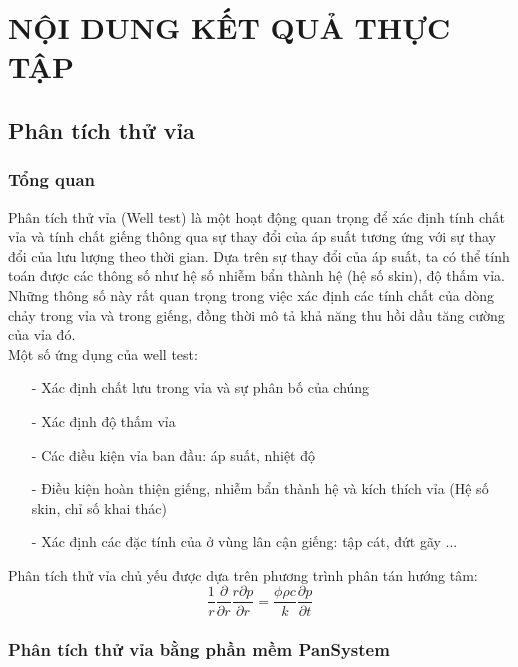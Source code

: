 \documentclass[12pt,a4paper]{report}
\begin{document}
\chapter{NỘI DUNG KẾT QUẢ THỰC TẬP}
\section{Phân tích thử vỉa}
\subsection{Tổng quan}
Phân tích thử vỉa (Well test) là một hoạt động quan trọng để xác định tính chất vỉa và tính chất giếng thông qua sự thay đổi của áp suất tương ứng với sự thay đổi của lưu lượng theo thời gian. Dựa trên sự thay đổi của áp suất, ta có thể tính toán được các thông số như hệ số nhiễm bẩn thành hệ (hệ số skin), độ thấm vỉa. Những thông số này rất quan trọng trong việc xác định các tính chất của dòng chảy trong vỉa và trong giếng, đồng thời mô tả khả năng thu hồi dầu tăng cường của vỉa đó.\\
Một số ứng dụng của well test:
	\begin{itemize}
    	\item[-] Xác định chất lưu trong vỉa và sự phân bố của chúng
        \item[-] Xác định độ thấm vỉa
        \item[-] Các điều kiện vỉa ban đầu: áp suất, nhiệt độ
        \item[-] Điều kiện hoàn thiện giếng, nhiễm bẩn thành hệ và kích thích vỉa (Hệ số skin, chỉ số khai thác)
        \item[-] Xác định các đặc tính của ở vùng lân cận giếng: tập cát, đứt gãy ...
    \end{itemize}
Phân tích thử vỉa chủ yếu được dựa trên phương trình phân tán hướng tâm:
	\begin{equation}\label{eqn:diffusion}
    	\dfrac{1}{r}\dfrac{\partial}{\partial r}\dfrac{r\partial p}{\partial r} = \dfrac{\phi\rho c}{k}\dfrac{\partial p}{\partial t}
    \end{equation}
\subsection{Phân tích thử vỉa bằng phần mềm PanSystem}
\end{document}
